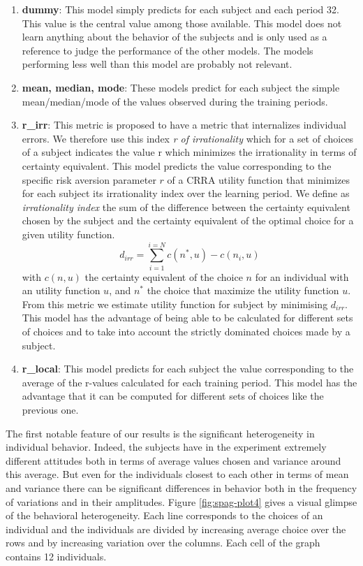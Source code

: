 \documentclass[
]{book}
\providecommand{\tightlist}{%
  \setlength{\itemsep}{0pt}\setlength{\parskip}{0pt}}
\begin{document}
\begin{enumerate}
\def\labelenumi{\arabic{enumi}.}
\tightlist
\item
  \textbf{dummy}: This model simply predicts for each subject and each
  period 32.
  This value is the central value among those available.
  This model does not learn anything about the behavior of the
  subjects and is only used as a reference to judge the performance of
  the other models.
  The models performing less well than this model are probably not relevant.
\item
  \textbf{mean, median, mode}: These models predict for each subject the simple
  mean/median/mode of the values observed during the training periods.
\item
  \textbf{r\_irr}: This metric is proposed to have a metric that internalizes
  individual errors.
  We therefore use this index \emph{r of irrationality} which for a set of choices of a
  subject indicates the value r which minimizes the irrationality in terms of
  certainty equivalent.
  This model predicts the value corresponding to the specific risk
  aversion parameter \(r\) of a CRRA utility function
  that minimizes for each subject its irrationality index over
  the learning period.
  We define as \emph{irrationality index} the sum of the
  difference between the certainty equivalent chosen by the subject
  and the certainty equivalent of the optimal choice for a given
  utility function.
  \[
  d_{irr} = \sum_{i =1}^{i = N}c(n^*, u)-c(n_i, u) 
  \]
  with \(c(n, u)\) the certainty equivalent of the choice \(n\) for
  an individual with an utility function \(u\), and \(n^*\) the choice that
  maximize the utility function \(u\).
  From this metric we estimate utility function for subject by minimising
  \(d_{irr}\).
  This model has the advantage of being able to be calculated for different sets
  of choices and to take into account the strictly dominated choices made by a subject.
\item
  \textbf{r\_local}: This model predicts for each subject the value
  corresponding to the average of the r-values calculated for each
  training period. This model has the advantage that it can be
  computed for different sets of choices like the previous one.
\end{enumerate}

The first notable feature of our results is the significant heterogeneity in
individual behavior. Indeed, the subjects have in the experiment
extremely different attitudes both in terms of average values chosen and
variance around this average. But even for the individuals closest to each other
in terms of mean and variance there can be significant differences in behavior
both in the frequency of variations and in their amplitudes.
Figure \ref{fig:spag-plot4} gives a visual glimpse of the behavioral
heterogeneity.
Each line corresponds to the choices of an individual and the individuals are
divided by increasing average choice over the rows and by increasing variation
over the columns.
Each cell of the graph contains 12 individuals.
\end{document}
